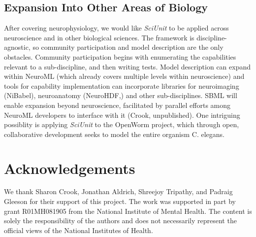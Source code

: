 \documentclass[11pt,letterpaper]{article}
\begin{document}
\subsection{Expansion Into Other Areas of Biology}
After covering neurophysiology, we would like \textit{SciUnit} to be applied across neuroscience and in other biological sciences. 
The framework is discipline-agnostic, so community participation and model description are the only obstacles. 
Community participation begins with enumerating the capabilities relevant to a sub-discipline, and then writing tests. 
Model description can expand within NeuroML (which already covers multiple levels within neuroscience) and tools for capability implementation can incorporate libraries for neuroimaging (NiBabel\cite{nibabel_url}), neuroanatomy (NeuroHDF,\cite{neurohdf_url}) and other sub-disciplines. 
SBML\cite{hucka_systems_2003,sbml_url} will enable expansion beyond neuroscience, facilitated by parallel efforts among NeuroML developers to interface with it (Crook, unpublished). 
One intriguing possiblity is applying \textit{SciUnit} to the OpenWorm project\cite{open_worm_url}, which through open, collaborative development seeks to model the entire organism C. elegans.  

\section{Acknowledgements}
We thank Sharon Crook, Jonathan Aldrich, Shreejoy Tripathy, and Padraig Gleeson for their support of this project.  
The work was supported in part by grant R01MH081905 from the National Institute of Mental Health. 
The content is solely the responsibility of the authors and does not necessarily represent the official views of the National Institutes of Health.



\end{document}
